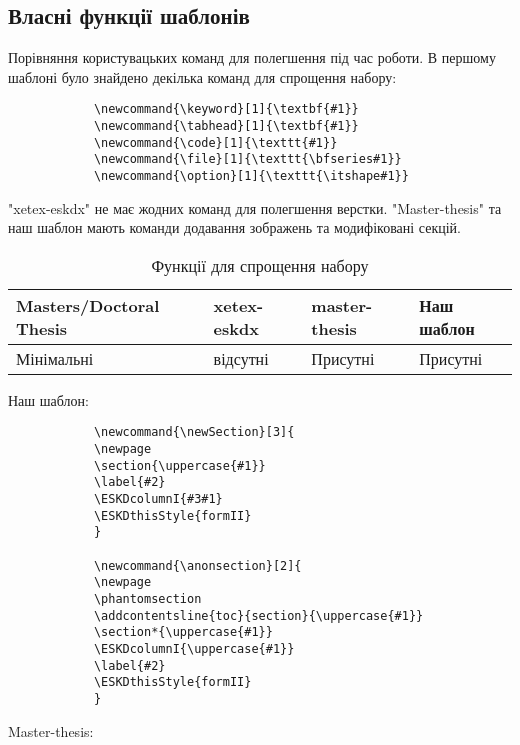 \subsection{Власні функції шаблонів}

Порівняння користувацьких команд для полегшення під час роботи. В першому шаблоні було знайдено декілька команд для спрощення набору:
\begin{lstlisting}
			\newcommand{\keyword}[1]{\textbf{#1}}
			\newcommand{\tabhead}[1]{\textbf{#1}}
			\newcommand{\code}[1]{\texttt{#1}}
			\newcommand{\file}[1]{\texttt{\bfseries#1}}
			\newcommand{\option}[1]{\texttt{\itshape#1}}
\end{lstlisting}

"xetex-eskdx" не має жодних команд для полегшення верстки. "Master-thesis" та наш шаблон мають команди додавання зображень та модифіковані секцій. 
\begin{table}[H]
	\caption{Функції для спрощення набору}\label{tab:tab4}
	\centering
	\begin{tabular}{C{0.2\textwidth}C{0.2\textwidth}C{0.2\textwidth}C{0.2\textwidth}}
		\toprule
		\textbf{Masters/Doctoral Thesis} & \textbf{xetex-eskdx} &  \textbf{master-thesis} & \textbf{Наш шаблон}\\
		\midrule
		Мінімальні & відсутні & Присутні &  Присутні\\ 
		\bottomrule
	\end{tabular}
\end{table}

\newpage
Наш шаблон: 

\begin{lstlisting}
			\newcommand{\newSection}[3]{
			\newpage
			\section{\uppercase{#1}}
			\label{#2}
			\ESKDcolumnI{#3#1}
			\ESKDthisStyle{formII}
			}
			
			\newcommand{\anonsection}[2]{
			\newpage
			\phantomsection
			\addcontentsline{toc}{section}{\uppercase{#1}}
			\section*{\uppercase{#1}}
			\ESKDcolumnI{\uppercase{#1}}
			\label{#2}
			\ESKDthisStyle{formII}
			}
\end{lstlisting}

Master-thesis:

